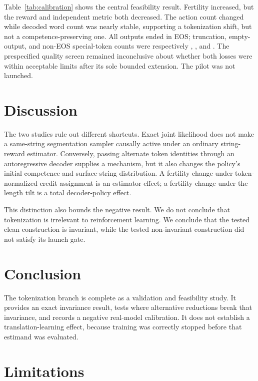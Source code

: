 \documentclass[11pt]{article}
\begin{document}
Table~\ref{tab:calibration} shows the central feasibility result.  Fertility
increased, but the reward and independent metric both decreased.  The action
count changed while decoded word count was nearly stable, supporting a
tokenization shift, but not a competence-preserving one.  All \EOSCount{}
outputs ended in EOS; truncation, empty-output, and non-EOS special-token counts
were respectively \TruncationCount{}, \EmptyCount{}, and \SpecialTokenCount{}.
The prespecified quality screen remained inconclusive about whether both losses
were within acceptable limits after its sole bounded extension.  The pilot was
not launched.

\section{Discussion}

The two studies rule out different shortcuts.  Exact joint likelihood does not
make a same-string segmentation sampler causally active under an ordinary
string-reward estimator.  Conversely, passing alternate token identities
through an autoregressive decoder supplies a mechanism, but it also changes
the policy's initial competence and surface-string distribution.  A fertility
change under token-normalized credit assignment is an estimator effect; a
fertility change under the length tilt is a total decoder-policy effect.

This distinction also bounds the negative result.  We do not conclude that
tokenization is irrelevant to reinforcement learning.  We conclude that the
tested clean construction is invariant, while the tested non-invariant
construction did not satisfy its launch gate.

\section{Conclusion}

The tokenization branch is complete as a validation and feasibility study.
It provides an exact invariance result, tests where alternative reductions
break that invariance, and records a negative real-model calibration.  It does
not establish a translation-learning effect, because training was correctly
stopped before that estimand was evaluated.

\section*{Limitations}
\end{document}
